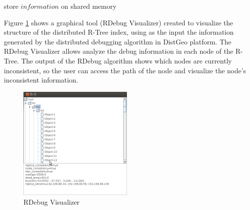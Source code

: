 \begin{center}
\begin{minipage}{1\textwidth}
\begin{algorithm2e}[H]
{    
		{
			store $information$ on shared memory\;
		}
            
}
\caption{$RDebug(T)$ 
\label {alg:rdebug}}
\end{algorithm2e}
\end{minipage}
\end{center}


Figure \ref{fig:rdebug-vis} shows a graphical tool (RDebug Visualizer) created to visualize the structure of the distributed R-Tree index, using as the input the information generated by the distributed debugging algorithm in DistGeo platform. The RDebug Visualizer allows analyze the debug information in each node of the R-Tree. The output of the RDebug algorithm shows which nodes are currently inconsistent, so the user can access the path of the node and visualize the node's inconsistent information.    

\begin{figure}[ht]
	\centering
		\includegraphics[width=0.5\textwidth]{rdebug-vis.jpg}
	\caption{RDebug Visualizer}
	\label{fig:rdebug-vis}
\end{figure}


